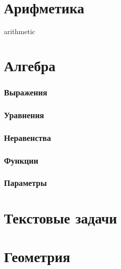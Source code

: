 \documentclass[10pt, a4paper]{article}
\begin{document}
\lhead{\leftmark} 
\part{Арифметика}
{arithmetic}
\part{Алгебра}
\section{Выражения}
\section{Уравнения}
\section{Неравенства}
\section{Функции}
\section{Параметры}
\part{Текстовые задачи}
\part{Геометрия}
\end{document}
